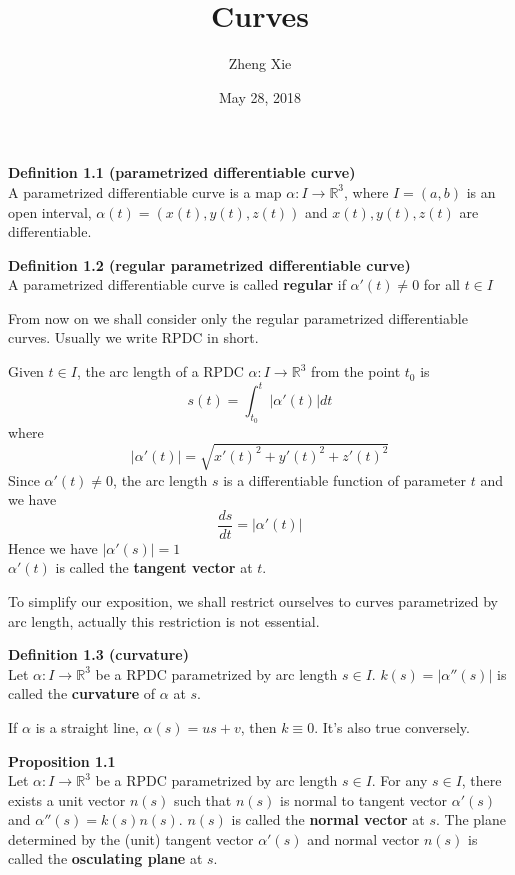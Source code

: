 \documentclass{article}
\author{Zheng Xie}
\title{Curves}
\date{May 28, 2018}
\begin{document}
\maketitle

\setlength\parindent{0em}   %
\setlength\parskip{1.0\baselineskip} %

\par
\textbf{Definition 1.1 (parametrized differentiable curve)}\\
A parametrized differentiable curve is a map $\alpha :I \to \mathbb R^3$, 
where $I = (a,b)$ is an open interval, $\alpha(t) = (x(t),y(t),z(t))$ and $x(t),y(t),z(t)$ are differentiable.

\par
\textbf{Definition 1.2 (regular parametrized differentiable curve)}\\
A parametrized differentiable curve is called \textbf{regular} if $\alpha'(t) \neq 0$ for all $t \in I$

\par
From now on we shall consider only the regular parametrized differentiable curves.
Usually we write RPDC in short.

\par
Given $t \in I$, the arc length of a RPDC $\alpha:I \to \mathbb R^3$ from the point $t_0$ is
$$
    s(t) = \int_{t_0}^t |{\alpha'(t)}|dt
$$
where
$$
    |{\alpha'(t)}| = \sqrt{x'(t)^2+y'(t)^2+z'(t)^2}
$$
Since $\alpha'(t) \neq 0$, the arc length $s$ is a differentiable function of parameter $t$ and we have
$$
    \frac{ds}{dt}=|\alpha'(t)|
$$
Hence we have $|\alpha'(s)| = 1$\\
$\alpha'(t)$ is called the \textbf{tangent vector} at $t$.

\par
To simplify our exposition, we shall restrict ourselves to curves parametrized by arc length, 
actually this restriction is not essential.

\par
\textbf{Definition 1.3 (curvature)}\\
Let $\alpha: I \to \mathbb R^3$ be a RPDC parametrized by arc length $s \in I$. $k(s) = |\alpha''(s)|$ is
called the \textbf{curvature} of $\alpha$ at $s$.

\par
If $\alpha$ is a straight line, $\alpha(s) = us + v$, then $k \equiv 0$. It's also true conversely.

\par
\textbf{Proposition 1.1}\\
Let $\alpha: I \to \mathbb R^3$ be a RPDC parametrized by arc length $s \in I$. For any $s \in I$,
there exists a unit vector $n(s)$ such that $n(s)$ is normal to tangent vector $\alpha'(s)$ and
$\alpha''(s) = k(s)n(s)$. $n(s)$ is called the \textbf{normal vector} at $s$. The plane determined by the
(unit) tangent vector $\alpha'(s)$ and normal vector $n(s)$ is called the \textbf{osculating plane} at $s$.
\end{document}
